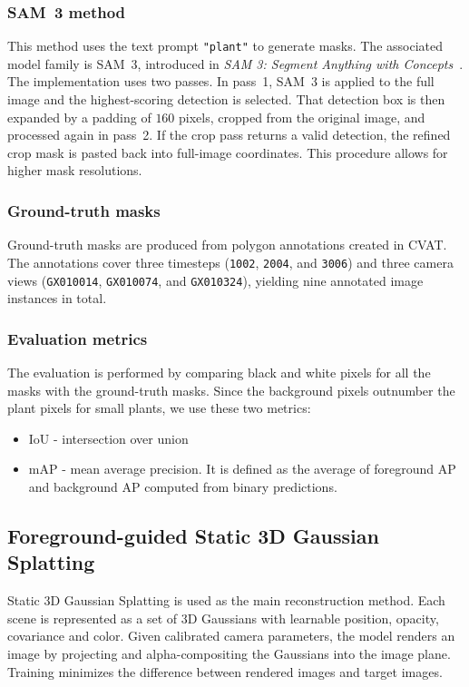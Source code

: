 \documentclass[sigconf]{acmart}
\begin{document}
\subsubsection{SAM~3 method}
This method uses the text prompt \texttt{"plant"} to generate masks. The associated model family is SAM~3, introduced in \emph{SAM 3: Segment Anything with Concepts}~\cite{carion2026sam3}. The implementation uses two passes. In pass~1, SAM~3 is applied to the full image and the highest-scoring detection is selected. That detection box is then expanded by a padding of $160$ pixels, cropped from the original image, and processed again in pass~2. If the crop pass returns a valid detection, the refined crop mask is pasted back into full-image coordinates. This procedure allows for higher mask resolutions. 
\subsubsection{Ground-truth masks} \label{sssec:gt_masks}
Ground-truth masks are produced from polygon annotations created in CVAT. The annotations cover three timesteps (\texttt{1002}, \texttt{2004}, and \texttt{3006}) and three camera views (\texttt{GX010014}, \texttt{GX010074}, and \texttt{GX010324}), yielding nine annotated image instances in total. 

\subsubsection{Evaluation metrics}
The evaluation is performed by comparing black and white pixels for all the masks with the ground-truth masks. Since the background pixels outnumber the plant pixels for small plants, we use these two metrics:  
\begin{itemize}
    \item IoU - intersection over union
    \item mAP - mean average precision. It is defined as the average of foreground AP and background AP computed from binary predictions. 
\end{itemize}

\subsection{Foreground-guided Static 3D Gaussian Splatting}
Static 3D Gaussian Splatting is used as the main reconstruction method. Each scene is represented as a set of 3D Gaussians with learnable position, opacity, covariance and color. Given calibrated camera parameters, the model renders an image by projecting and alpha-compositing the Gaussians into the image plane. Training minimizes the difference between rendered images and target images.
\end{document}
